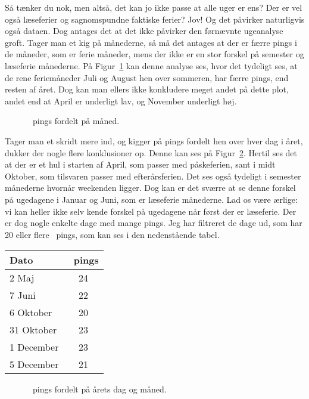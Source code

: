 \documentclass{article}
\newlength\myheight
\newlength\mydepth
\newcommand*\inlinegraphics[1]{%
  \settototalheight\myheight{Xygp}%
  \settodepth\mydepth{Xygp}%
  \raisebox{-\mydepth}{\texttt{[image: \#1]}}%
}
\newcommand{\coffee}[0]{\inlinegraphics{coffee.png}}
\begin{document}
Så tænker du nok, men altså, det kan jo ikke passe at alle uger er ens? Der er vel også læseferier og sagnomspundne faktiske ferier? Jov! Og det påvirker naturligvis også dataen. Dog antages det at det ikke påvirker den førnævnte ugeanalyse groft. Tager man et kig på månederne, så må det antages at der er færre pings i de måneder, som er ferie måneder, mens der ikke er en stor forskel på semester og læseferie månederne. På Figur~\ref{fig:2} kan denne analyse ses, hvor det tydeligt ses, at de rene feriemåneder Juli og August hen over sommeren, har færre pings, end resten af året. Dog kan man ellers ikke konkludere meget andet på dette plot, andet end at April er underligt lav, og November underligt høj.

\begin{figure}
	\centering
	\resizebox{\textwidth}{!}{}
	\vspace{-25pt}
	\caption{\protect\coffee\ pings fordelt på måned.}
	\label{fig:2}
\end{figure}

Tager man et skridt mere ind, og kigger på pings fordelt hen over hver dag i året, dukker der nogle flere konklusioner op. Denne kan ses på Figur~\ref{fig:3}. Hertil ses det at der er et hul i starten af April, som passer med påskeferien, sant i midt Oktober, som tilsvaren passer med efterårsferien. Det ses også tydeligt i semester månederne hvornår weekenden ligger. Dog kan er det sværre at se denne forskel på ugedagene i Januar og Juni, som er læseferie månederne. Lad os være ærlige: vi kan heller ikke selv kende forskel på ugedagene når først der er læseferie. Der er dog nogle enkelte dage med mange pings. Jeg har filtreret de dage ud, som har 20 eller flere \coffee\ pings, som kan ses i den nedenstående tabel.
\begin{center}
	\begin{tabular}{l|c}
		Dato & \coffee\ pings \\ \hline
		\phantom{3}2 Maj & 24 \\
		\phantom{3}7 Juni & 22 \\
		\phantom{3}6 Oktober & 20 \\
		31 Oktober & 23 \\
		\phantom{3}1 December & 23 \\
		\phantom{3}5 December & 21
	\end{tabular}
\end{center}
\begin{figure}
	\centering
	\resizebox{\textwidth}{!}{}
	\vspace{-25pt}
	\caption{\protect\coffee\ pings fordelt på årets dag og måned.}
	\label{fig:3}
\end{figure}
\end{document}
